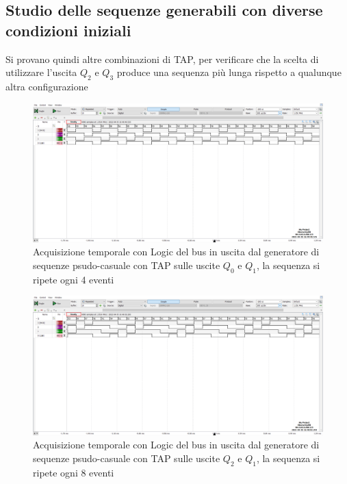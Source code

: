 \documentclass[10pt, a4paper, italian]{article}
\begin{document}
\subsection{Studio delle sequenze generabili con diverse condizioni iniziali}
Si provano quindi altre combinazioni di TAP, per verificare che la scelta di utilizzare l'uscita $Q_2$ e $Q_3$ produce una sequenza più lunga rispetto a qualunque altra configurazione
\begin{figure}[htbp]
\centering
	\includegraphics[width=\textwidth]{4.b_10}
	\caption{Acquisizione temporale con Logic del bus in uscita dal generatore di sequenze psudo-casuale con TAP sulle uscite $Q_0$ e $Q_1$, la sequenza si ripete ogni 4 eventi
	\label{fig: TAP_10}}
\end{figure}
\begin{figure}[htbp]
\centering
	\includegraphics[width=\textwidth]{4.b_21}
	\caption{Acquisizione temporale con Logic del bus in uscita dal generatore di sequenze psudo-casuale con TAP sulle uscite $Q_2$ e $Q_1$, la sequenza si ripete ogni 8 eventi
	\label{fig: TAP_21}}
\end{figure}
\end{document}
